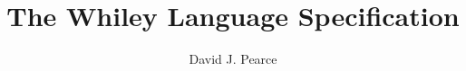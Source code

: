 \documentclass[10pt]{book}
\title{\Huge {\bf The Whiley Language Specification}}
\author{David J. Pearce}
\begin{document}

\tableofcontents









%


%
%
%

\printglossaries



\end{document}
